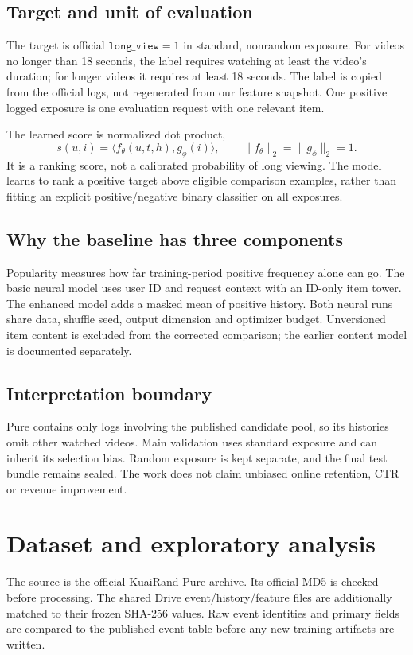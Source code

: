 \documentclass[11pt,a4paper]{article}
\begin{document}
\subsection{Target and unit of evaluation}
The target is official $\texttt{long\_view}=1$ in standard, nonrandom exposure. For videos no longer than 18 seconds, the label requires watching at least the video's duration; for longer videos it requires at least 18 seconds. The label is copied from the official logs, not regenerated from our feature snapshot. One positive logged exposure is one evaluation request with one relevant item.

The learned score is normalized dot product,
\[s(u,i)=\langle f_\theta(u,t,h),g_\phi(i)\rangle,\qquad \|f_\theta\|_2=\|g_\phi\|_2=1.\]
It is a ranking score, not a calibrated probability of long viewing. The model learns to rank a positive target above eligible comparison examples, rather than fitting an explicit positive/negative binary classifier on all exposures.

\subsection{Why the baseline has three components}
Popularity measures how far training-period positive frequency alone can go. The basic neural model uses user ID and request context with an ID-only item tower. The enhanced model adds a masked mean of positive history. Both neural runs share data, shuffle seed, output dimension and optimizer budget. Unversioned item content is excluded from the corrected comparison; the earlier content model is documented separately.

\subsection{Interpretation boundary}
Pure contains only logs involving the published candidate pool, so its histories omit other watched videos. Main validation uses standard exposure and can inherit its selection bias. Random exposure is kept separate, and the final test bundle remains sealed. The work does not claim unbiased online retention, CTR or revenue improvement.
\clearpage
\section{Dataset and exploratory analysis}
The source is the official KuaiRand-Pure archive. Its official MD5 is checked before processing. The shared Drive event/history/feature files are additionally matched to their frozen SHA-256 values. Raw event identities and primary fields are compared to the published event table before any new training artifacts are written.
\end{document}
